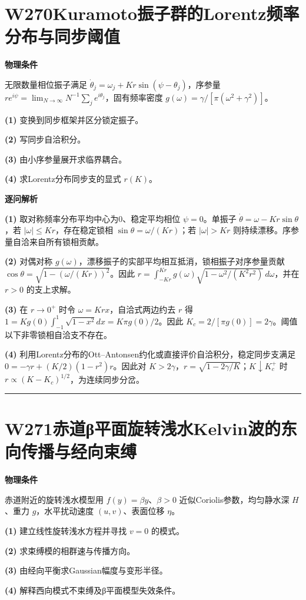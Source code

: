 \documentclass[UTF8,a4paper,11pt,oneside,openany]{ctexbook}
\begin{document}
\section*{W270\quad Kuramoto振子群的Lorentz频率分布与同步阈值}
\textbf{物理条件}\par 无限数量相位振子满足 \(\dot\theta_j=\omega_j+K r\sin(\psi-\theta_j)\)，序参量 \(re^{i\psi}=\lim_{N\to\infty}N^{-1}\sum_je^{i\theta_j}\)，固有频率密度 \(g(\omega)=\gamma/[\pi(\omega^2+\gamma^2)]\)。
\par\noindent\textbf{(1)} 变换到同步框架并区分锁定振子。
\par\noindent\textbf{(2)} 写同步自洽积分。
\par\noindent\textbf{(3)} 由小序参量展开求临界耦合。
\par\noindent\textbf{(4)} 求Lorentz分布同步支的显式 \(r(K)\)。

\par\medskip\noindent\textbf{逐问解析}
\par\noindent\textbf{(1)} 取对称频率分布平均中心为0、稳定平均相位 \(\psi=0\)。单振子 \(\dot\theta=\omega-Kr\sin\theta\)，若 \(|\omega|\le Kr\)，存在稳定锁相 \(\sin\theta=\omega/(Kr)\)；若 \(|\omega|>Kr\) 则持续漂移。序参量自洽来自所有锁相贡献。
\par\noindent\textbf{(2)} 对偶对称 \(g(\omega)\)，漂移振子的实部平均相互抵消，锁相振子对序参量贡献 \(\cos\theta=\sqrt{1-(\omega/(Kr))^2}\)。因此 \(r=\int_{-Kr}^{Kr}g(\omega)\sqrt{1-\omega^2/(K^2r^2)}\,d\omega\)，并在 \(r>0\) 的支上求解。
\par\noindent\textbf{(3)} 在 \(r\to0^+\) 时令 \(\omega=Krx\)，自洽式两边约去 \(r\) 得 \(1=K g(0)\int_{-1}^1\sqrt{1-x^2}dx=K\pi g(0)/2\)。因此 \(K_c=2/[\pi g(0)]=2\gamma\)。阈值以下非零锁相自洽支不存在。
\par\noindent\textbf{(4)} 利用Lorentz分布的Ott–Antonsen约化或直接评价自洽积分，稳定同步支满足 \(0=-\gamma r+(K/2)(1-r^2)r\)。因此对 \(K>2\gamma\)，\(r=\sqrt{1-2\gamma/K}\)；\(K\downarrow K_c^+\) 时 \(r\propto(K-K_c)^{1/2}\)，为连续同步分岔。

\par\bigskip\hrule\bigskip
\section*{W271\quad 赤道β平面旋转浅水Kelvin波的东向传播与经向束缚}
\textbf{物理条件}\par 赤道附近的旋转浅水模型用 \(f(y)=\beta y\)、\(\beta>0\) 近似Coriolis参数，均匀静水深 \(H\)、重力 \(g\)，水平扰动速度 \((u,v)\)、表面位移 \(\eta\)。
\par\noindent\textbf{(1)} 建立线性旋转浅水方程并寻找 \(v=0\) 的模式。
\par\noindent\textbf{(2)} 求束缚模的相群速与传播方向。
\par\noindent\textbf{(3)} 由经向平衡求Gaussian幅度与变形半径。
\par\noindent\textbf{(4)} 解释西向模式不束缚及β平面模型失效条件。
\end{document}
